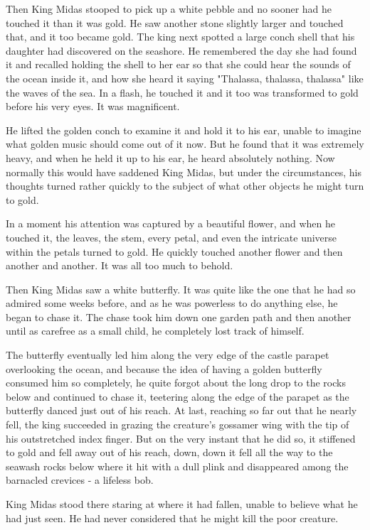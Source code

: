 Then King Midas stooped to pick up a white pebble and no sooner had he touched it than it was gold. He saw another stone slightly larger and touched that, and it too became gold. The king next spotted a large conch shell that his daughter had discovered on the seashore. He remembered the day she had found it and recalled holding the shell to her ear so that she could hear the sounds of the ocean inside it, and how she heard it saying "Thalassa, thalassa, thalassa" like the waves of the sea. In a flash, he touched it and it too was transformed to gold before his very eyes. It was magnificent.

He lifted the golden conch to examine it and hold it to his ear, unable to imagine what golden music should come out of it now. But he found that it was extremely heavy, and when he held it up to his ear, he heard absolutely nothing. Now normally this would have saddened King Midas, but under the circumstances, his thoughts turned rather quickly to the subject of what other objects he might turn to gold.

In a moment his attention was captured by a beautiful flower, and when he touched it, the leaves, the stem, every petal, and even the intricate universe within the petals turned to gold. He quickly touched another flower and then another and another. It was all too much to behold.

Then King Midas saw a white butterfly. It was quite like the one that he had so admired some weeks before, and as he was powerless to do anything else, he began to chase it. The chase took him down one garden path and then another until as carefree as a small child, he completely lost track of himself.

The butterfly eventually led him along the very edge of the castle parapet overlooking the ocean, and because the idea of having a golden butterfly consumed him so completely, he quite forgot about the long drop to the rocks below and continued to chase it, teetering along the edge of the parapet as the butterfly danced just out of his reach. At last, reaching so far out that he nearly fell, the king succeeded in grazing the creature's gossamer wing with the tip of his outstretched index finger. But on the very instant that he did so, it stiffened to gold and fell away out of his reach, down, down it fell all the way to the seawash rocks below where it hit with a dull plink and disappeared among the barnacled crevices - a lifeless bob.

King Midas stood there staring at where it had fallen, unable to believe what he had just seen. He had never considered that he might kill the poor creature.

